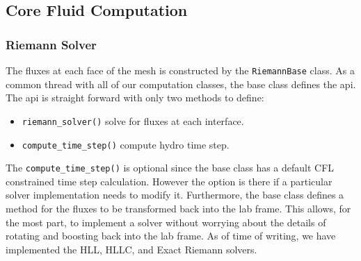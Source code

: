 \subsection{Core Fluid Computation}
\subsubsection{Riemann Solver}
The fluxes at each face of the mesh is constructed by the \lstinline{RiemannBase} class.
As a common thread with all of our computation classes, the base class defines the api.
The api is straight forward with only two methods to define:
\begin{itemize}
	\item \lstinline{riemann_solver()} solve for fluxes at each interface.
    \item \lstinline{compute_time_step()} compute hydro time step.
\end{itemize}
The \lstinline{compute_time_step()} is optional since the base class has a default
CFL constrained time step calculation. However the option is there if a particular 
solver implementation needs to modify it. Furthermore, the base class defines a 
method for the fluxes to be transformed back into the lab frame. This allows,
for the most part, to implement a solver without worrying about the details of
rotating and boosting back into the lab frame. As of time of writing, we have
implemented the HLL, HLLC, and Exact Riemann solvers.

